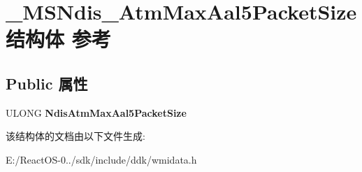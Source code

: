 \hypertarget{struct___m_s_ndis___atm_max_aal5_packet_size}{}\section{\+\_\+\+M\+S\+Ndis\+\_\+\+Atm\+Max\+Aal5\+Packet\+Size结构体 参考}
\label{struct___m_s_ndis___atm_max_aal5_packet_size}
\subsection*{Public 属性}
\begin{DoxyCompactItemize}
\item 
\mbox{\label{struct___m_s_ndis___atm_max_aal5_packet_size_a72893f72253d1fb26ccc9f04ea9c09b5}} 
U\+L\+O\+NG {\bfseries Ndis\+Atm\+Max\+Aal5\+Packet\+Size}
\end{DoxyCompactItemize}


该结构体的文档由以下文件生成\+:\begin{DoxyCompactItemize}
\item 
E\+:/\+React\+O\+S-\/0../sdk/include/ddk/wmidata.\+h\end{DoxyCompactItemize}
